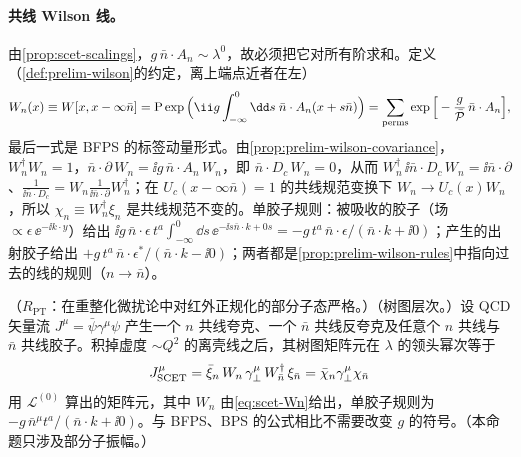 \paragraph{共线 Wilson 线。}
由\cref{prop:scet-scalings}，$g\,\bar n\cdot A_n\sim\lambda^0$，故必须把它对所有阶求和。定义（\cref{def:prelim-wilson}的约定，离上端点近者在左）
\begin{equation}\label{eq:scet-Wn}
W_n(x)\equiv W[x,x-\infty\bar n]=\mathrm P\exp\Big(\ii g\int_{-\infty}^0\dd s\;\bar n\cdot A_n(x+s\bar n)\Big)
=\sum_{\rm perms}\exp\Big[-\frac{g}{\bar{\mathcal P}}\,\bar n\cdot A_n\Big],
\end{equation}
最后一式是 BFPS 的标签动量形式\cite{BauerEtAl2001}。由\cref{prop:prelim-wilson-covariance}，$W_n^\dagger W_n=1$，$\bar n\cdot\partial\,W_n=\ii g\,\bar n\cdot A_n\,W_n$，即 $\bar n\cdot D_c\,W_n=0$，从而
$W_n^\dagger\,\ii\bar n\cdot D_c\,W_n=\ii\bar n\cdot\partial$、$\frac{1}{\ii\bar n\cdot D_c}=W_n\frac{1}{\ii\bar n\cdot\partial}W_n^\dagger$；在 $U_c(x-\infty\bar n)=1$ 的共线规范变换下 $W_n\to U_c(x)W_n$，所以 $\chi_n\equiv W_n^\dagger\xi_n$ 是共线规范不变的。单胶子规则：被吸收的胶子（场 $\propto\epsilon\,\ee^{-\ii k\cdot y}$）给出 $\ii g\,\bar n\cdot\epsilon\,t^a\int_{-\infty}^0\dd s\,\ee^{-\ii s\bar n\cdot k+0s}=-g\,t^a\,\bar n\cdot\epsilon/(\bar n\cdot k+\ii0)$；产生的出射胶子给出 $+g\,t^a\,\bar n\cdot\epsilon^*/(\bar n\cdot k-\ii0)$；两者都是\cref{prop:prelim-wilson-rules}中指向过去的线的规则（$n\to\bar n$）。

\begin{proposition}\label{prop:scet-wilson}
（$R_{\mathrm{PT}}$：在重整化微扰论中对红外正规化的部分子态严格。）（树图层次。）设 QCD 矢量流 $J^\mu=\bar\psi\gamma^\mu\psi$ 产生一个 $n$ 共线夸克、一个 $\bar n$ 共线反夸克及任意个 $n$ 共线与 $\bar n$ 共线胶子。积掉虚度 $\sim Q^2$ 的离壳线之后，其树图矩阵元在 $\lambda$ 的领头幂次等于
\begin{equation}\label{eq:scet-Jtree}
J^\mu_{\rm SCET}=\bar\xi_n\,W_n\,\gamma_\perp^\mu\,W_{\bar n}^\dagger\,\xi_{\bar n}=\bar\chi_n\gamma_\perp^\mu\chi_{\bar n}
\end{equation}
用 $\mathcal L^{(0)}$ 算出的矩阵元，其中 $W_n$ 由\cref{eq:scet-Wn}给出，单胶子规则为 $-g\,\bar n^\mu t^a/(\bar n\cdot k+\ii0)$。与 BFPS、BPS 的公式相比不需要改变 $g$ 的符号。（本命题只涉及部分子振幅。）
\end{proposition}

